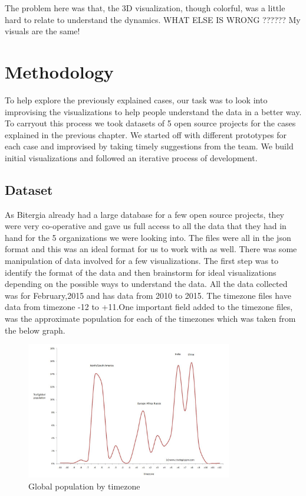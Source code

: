 \documentclass[double,12pt]{beavtex}
\begin{document}
The problem here was that, the 3D visualization, though colorful, was a little hard to relate to understand the dynamics. WHAT ELSE IS WRONG ?????? My visuals are the same!


\chapter{Methodology}
To help explore the previously explained cases, our task was to look into improvising the visualizations to help people understand the data in a better way. To carryout this process we took datasets of 5 open source projects for the cases explained in the previous chapter. We started off with different prototypes for each case and improvised by taking timely suggestions from the team. We build initial visualizations and followed an iterative process of development.

\section{Dataset}
As Bitergia already had a large database for a few open source projects, they were very co-operative and gave us full access to all the data that they had in hand for the 5 organizations we were looking into. The files were all in the json format and this was an ideal format for us to work with as well. There was some manipulation of data involved for a few visualizations. The first step was to identify the format of the data and then brainstorm for ideal visualizations depending on the possible ways to understand the data. All the data collected was for February,2015 and has data from 2010 to 2015. The timezone files have data from timezone -12 to +11.One important field added to the timezone files, was the approximate population for each of the timezones which was taken from the below graph.

\begin{figure}[!ht]
\centering
\includegraphics[width=90mm]{pop1.jpg}
\caption{Global population by timezone}
\end{figure}
\end{document}
